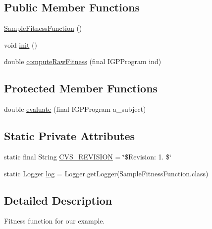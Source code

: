 \subsection*{Public Member Functions}
\begin{DoxyCompactItemize}
\item 
\hyperlink{classexamples_1_1grid_1_1math_problem_distributed_1_1_sample_fitness_function_a7eb6648652d9def4a2930e382bf629dd}{Sample\-Fitness\-Function} ()
\item 
void \hyperlink{classexamples_1_1grid_1_1math_problem_distributed_1_1_sample_fitness_function_a5326e32f2ab10637cf20122e56385181}{init} ()
\item 
double \hyperlink{classexamples_1_1grid_1_1math_problem_distributed_1_1_sample_fitness_function_a8bbdf1090805b191e2eda20ad6ef06b7}{compute\-Raw\-Fitness} (final I\-G\-P\-Program ind)
\end{DoxyCompactItemize}
\subsection*{Protected Member Functions}
\begin{DoxyCompactItemize}
\item 
double \hyperlink{classexamples_1_1grid_1_1math_problem_distributed_1_1_sample_fitness_function_a53e431da1c2f5602e9790d8ea5baab56}{evaluate} (final I\-G\-P\-Program a\-\_\-subject)
\end{DoxyCompactItemize}
\subsection*{Static Private Attributes}
\begin{DoxyCompactItemize}
\item 
static final String \hyperlink{classexamples_1_1grid_1_1math_problem_distributed_1_1_sample_fitness_function_a23ba47400faea70585b58eca39aa6a4e}{C\-V\-S\-\_\-\-R\-E\-V\-I\-S\-I\-O\-N} = \char`\"{}\$Revision\-: 1. \$\char`\"{}
\item 
static Logger \hyperlink{classexamples_1_1grid_1_1math_problem_distributed_1_1_sample_fitness_function_a144f4d302886d9bbf2a5b025c1684ae3}{log} = Logger.\-get\-Logger(Sample\-Fitness\-Function.\-class)
\end{DoxyCompactItemize}


\subsection{Detailed Description}
Fitness function for our example.

